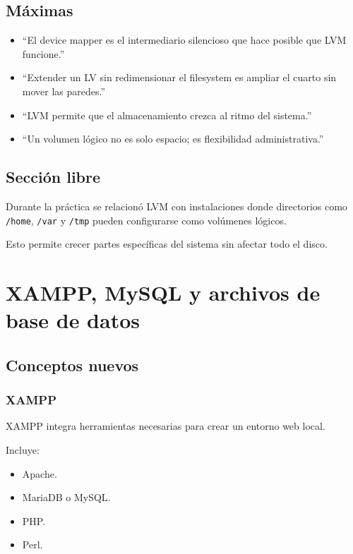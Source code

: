 \documentclass[11pt, letterpaper]{article}
\begin{document}
\subsection{Máximas}
\label{sec:org0a48ca4}

\begin{itemize}
\item “El device mapper es el intermediario silencioso que hace posible que LVM funcione.”
\item “Extender un LV sin redimensionar el filesystem es ampliar el cuarto sin mover las paredes.”
\item “LVM permite que el almacenamiento crezca al ritmo del sistema.”
\item “Un volumen lógico no es solo espacio; es flexibilidad administrativa.”
\end{itemize}
\subsection{Sección libre}
\label{sec:orgc97843a}

Durante la práctica se relacionó LVM con instalaciones donde directorios como \texttt{/home}, \texttt{/var} y \texttt{/tmp} pueden configurarse como volúmenes lógicos.

Esto permite crecer partes específicas del sistema sin afectar todo el disco.

\newpage
\section{XAMPP, MySQL y archivos de base de datos}
\label{sec:orgb6362eb}

\subsection{Conceptos nuevos}
\label{sec:org6aab686}

\subsubsection{XAMPP}
\label{sec:org6724a34}

XAMPP integra herramientas necesarias para crear un entorno web local.

Incluye:

\begin{itemize}
\item Apache.
\item MariaDB o MySQL.
\item PHP.
\item Perl.
\end{itemize}
\end{document}
